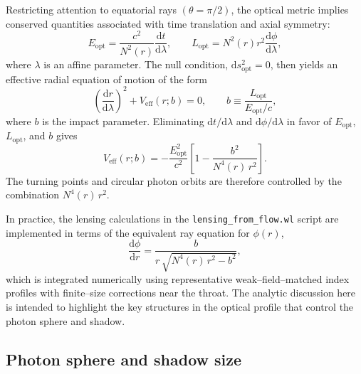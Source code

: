 \documentclass[11pt]{article}
\begin{document}
Restricting attention to equatorial rays \((\theta = \pi/2)\), the optical
metric implies conserved quantities associated with time translation and
axial symmetry:
\begin{equation}
  E_{\text{opt}}
  = \frac{c^2}{N^2(r)} \frac{\mathrm{d}t}{\mathrm{d}\lambda},
  \qquad
  L_{\text{opt}}
  = N^2(r) r^2 \frac{\mathrm{d}\phi}{\mathrm{d}\lambda},
  \label{eq:optical-conserved}
\end{equation}
where \(\lambda\) is an affine parameter.  The null condition,
\(\mathrm{d}s_{\text{opt}}^2 = 0\), then yields an effective radial equation
of motion of the form
\begin{equation}
  \left( \frac{\mathrm{d}r}{\mathrm{d}\lambda} \right)^2
  + V_{\text{eff}}(r; b)
  = 0,
  \qquad
  b \equiv \frac{L_{\text{opt}}}{E_{\text{opt}}/c},
  \label{eq:optical-radial-eq}
\end{equation}
where \(b\) is the impact parameter.  Eliminating
\(\mathrm{d}t/\mathrm{d}\lambda\) and \(\mathrm{d}\phi/\mathrm{d}\lambda\)
in favor of \(E_{\text{opt}}\), \(L_{\text{opt}}\), and \(b\) gives
\begin{equation}
  V_{\text{eff}}(r; b)
  = -\frac{E_{\text{opt}}^2}{c^2}
    \left[
      1 - \frac{b^2}{N^4(r)\,r^2}
    \right].
  \label{eq:Veff-def}
\end{equation}
The turning points and circular photon orbits are therefore controlled by
the combination \(N^4(r)\,r^2\).

In practice, the lensing calculations in the
\texttt{lensing\_from\_flow.wl} script are implemented in terms of the
equivalent ray equation for \(\phi(r)\),
\begin{equation}
  \frac{\mathrm{d}\phi}{\mathrm{d}r}
  = \frac{b}{r\,\sqrt{N^4(r)\,r^2 - b^2}},
  \label{eq:dphi-dr}
\end{equation}
which is integrated numerically using representative weak--field--matched
index profiles with finite--size corrections near the throat.  The analytic
discussion here is intended to highlight the key structures in the optical
profile that control the photon sphere and shadow.

\subsection{Photon sphere and shadow size}
\label{subsec:photon-sphere-shadow}
\end{document}
